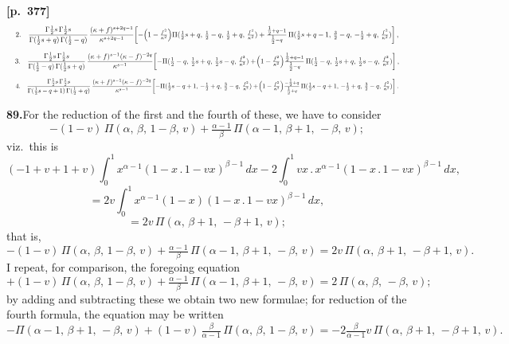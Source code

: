 \documentclass[11pt]{article}
\begin{document}
\bigskip

\noindent\textbf{[p.~377]}\quad
\[
\resizebox{\textwidth}{!}{$\displaystyle
2.\quad \frac{\Gamma\tfrac{1}{2}s\,\Gamma\tfrac{1}{2}s}{\Gamma(\tfrac{1}{2}s+q)\,\Gamma(\tfrac{1}{2}-q)}\,\frac{(\kappa+f)^{s+2q-1}}{\kappa^{s+2q-1}}\!\left[-\!\left(1-\tfrac{f^{2}}{\kappa^{2}}\right)\!\Pi(\tfrac{1}{2}s+q,\,\tfrac{1}{2}-q,\,\tfrac{1}{2}+q,\,\tfrac{f^{2}}{\kappa^{2}}) + \tfrac{\tfrac{1}{2}+q-1}{\tfrac{1}{2}-q}\,\Pi(\tfrac{1}{2}s+q-1,\,\tfrac{3}{2}-q,\,-\tfrac{1}{2}+q,\,\tfrac{f^{2}}{\kappa^{2}})\right],$}
\]
\[
\resizebox{\textwidth}{!}{$\displaystyle
3.\quad \frac{\Gamma\tfrac{1}{2}s\,\Gamma\tfrac{1}{2}s}{\Gamma(\tfrac{1}{2}-q)\,\Gamma(\tfrac{1}{2}s+q)}\,\frac{(\kappa+f)^{s-1}(\kappa-f)^{-2q}}{\kappa^{s-1}}\!\left[-\Pi(\tfrac{1}{2}-q,\,\tfrac{1}{2}s+q,\,\tfrac{1}{2}s-q,\,\tfrac{f^{2}}{\kappa^{2}}) + \!\left(1-\tfrac{f^{2}}{\kappa^{2}}\right)\!\tfrac{\tfrac{1}{2}+q-1}{\tfrac{1}{2}-q}\,\Pi(\tfrac{1}{2}-q,\,\tfrac{1}{2}s+q,\,\tfrac{1}{2}s-q,\,\tfrac{f^{2}}{\kappa^{2}})\right],$}
\]
\[
\resizebox{\textwidth}{!}{$\displaystyle
4.\quad \frac{\Gamma\tfrac{1}{2}s\,\Gamma\tfrac{1}{2}s}{\Gamma(\tfrac{1}{2}s-q+1)\,\Gamma(\tfrac{1}{2}+q)}\,\frac{(\kappa+f)^{s-1}(\kappa-f)^{-2q}}{\kappa^{s-1}}\!\left[-\Pi(\tfrac{1}{2}s-q+1,\,-\tfrac{1}{2}+q,\,\tfrac{3}{2}-q,\,\tfrac{f^{2}}{\kappa^{2}}) + \!\left(1-\tfrac{f^{2}}{\kappa^{2}}\right)\!\tfrac{-\tfrac{1}{2}+q}{\tfrac{1}{2}+q}\,\Pi(\tfrac{1}{2}s-q+1,\,-\tfrac{1}{2}+q,\,\tfrac{3}{2}-q,\,\tfrac{f^{2}}{\kappa^{2}})\right].$}
\]

\bigskip

\noindent\textbf{89.}\quad For the reduction of the first and the fourth of these, we have to consider
\[
-(1-v)\,\Pi(\alpha,\,\beta,\,1-\beta,\,v) + \tfrac{\alpha-1}{\beta}\,\Pi(\alpha-1,\,\beta+1,\,-\beta,\,v);
\]
viz.\ this is
\[
(-1+v+1+v)\!\int_{0}^{1} x^{\alpha-1}(1-x\,.\,1-vx)^{\beta-1}\,dx - 2\!\int_{0}^{1} vx\,.\,x^{\alpha-1}(1-x\,.\,1-vx)^{\beta-1}\,dx,
\]
\[
= 2v\!\int_{0}^{1} x^{\alpha-1}(1-x)(1-x\,.\,1-vx)^{\beta-1}\,dx,
\]
\[
= 2v\,\Pi(\alpha,\,\beta+1,\,-\beta+1,\,v);
\]
that is,
\[
-(1-v)\,\Pi(\alpha,\,\beta,\,1-\beta,\,v) + \tfrac{\alpha-1}{\beta}\,\Pi(\alpha-1,\,\beta+1,\,-\beta,\,v) = 2v\,\Pi(\alpha,\,\beta+1,\,-\beta+1,\,v).
\]
I repeat, for comparison, the foregoing equation
\[
+(1-v)\,\Pi(\alpha,\,\beta,\,1-\beta,\,v) + \tfrac{\alpha-1}{\beta}\,\Pi(\alpha-1,\,\beta+1,\,-\beta,\,v) = 2\,\Pi(\alpha,\,\beta,\,-\beta,\,v);
\]
by adding and subtracting these we obtain two new formulae; for reduction of the fourth formula, the equation may be written
\[
-\Pi(\alpha-1,\,\beta+1,\,-\beta,\,v) + (1-v)\,\tfrac{\beta}{\alpha-1}\,\Pi(\alpha,\,\beta,\,1-\beta,\,v) = -2\tfrac{\beta}{\alpha-1}v\,\Pi(\alpha,\,\beta+1,\,-\beta+1,\,v).
\]
\end{document}
